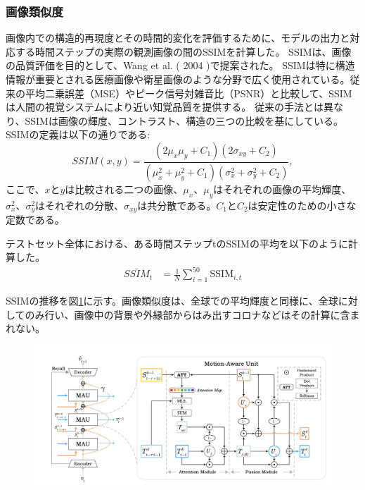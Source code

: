       \subsubsection{画像類似度}
        画像内での構造的再現度とその時間的変化を評価するために、モデルの出力と対応する時間ステップの実際の観測画像の間のSSIMを計算した。
        SSIMは、画像の品質評価を目的として、Wang et al. ( 2004 )\cite{wang2004image}で提案された。
        SSIMは特に構造情報が重要とされる医療画像や衛星画像のような分野で広く使用されている。従来の平均二乗誤差（MSE）やピーク信号対雑音比（PSNR）と比較して、SSIMは人間の視覚システムにより近い知覚品質を提供する。
        従来の手法とは異なり、SSIMは画像の輝度、コントラスト、構造の三つの比較を基にしている。
        SSIMの定義は以下の通りである:
        \begin{equation}
          SSIM(x, y) = \frac{(2\mu_x \mu_y + C_1)(2\sigma_{xy} + C_2)}{(\mu_x^2 + \mu_y^2 + C_1)(\sigma_x^2 + \sigma_y^2 + C_2)},     
        \end{equation}
        ここで、$x$と$y$は比較される二つの画像、$\mu_x$、$\mu_y$はそれぞれの画像の平均輝度、$\sigma_x^2$、$\sigma_y^2$はそれぞれの分散、$\sigma_{xy}$は共分散である。$C_1$と$C_2$は安定性のための小さな定数である。
        
        テストセット全体における、ある時間ステップtのSSIMの平均を以下のように計算した。
        \begin{align}
          \bar{SSIM}_{t} & = \frac{1}{N} \sum_{i=1}^{50} \text{SSIM}_{i,t}
        \end{align}

        SSIMの推移を図\ref{fig:exp1_ssim_line}に示す。画像類似度は、全球での平均輝度と同様に、全球に対してのみ行い、画像中の背景や外縁部からはみ出すコロナなどはその計算に含まれない。

        \begin{figure}[htpb]
          \centering
          \includegraphics[width=\textwidth]{figures/mau.png}
          \caption{}
          \label{fig:exp1_ssim_line}
        \end{figure}
        

